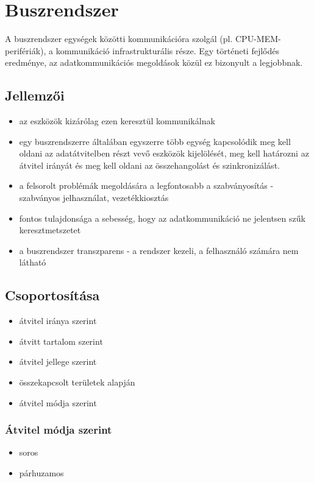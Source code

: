 
\chapter{Buszrendszer}

A buszrendszer egységek közötti kommunikációra szolgál (pl. CPU-MEM-perifériák), a kommunikáció infrastrukturális része.
Egy történeti fejlődés eredménye, az adatkommunikációs megoldások közül ez bizonyult a legjobbnak.

\section{Jellemzői}
\begin{itemize}
    \item az eszközök kizárólag ezen keresztül kommunikálnak
    \item egy buszrendszerre általában egyszerre több egység kapcsolódik \textrightarrow meg kell oldani az adatátvitelben részt vevő eszközök kijelölését, meg kell határozni az átvitel irányát és meg kell oldani az összehangolást és szinkronizálást.
    \item a felsorolt problémák megoldására a legfontosabb a szabványosítás - szabványos jelhasználat, vezetékkiosztás
    \item fontos tulajdonsága a sebesség, hogy az adatkommunikáció ne jelentsen szűk keresztmetszetet
    \item a buszrendszer transzparens - a rendszer kezeli, a felhasználó számára nem látható
\end{itemize}

\section{Csoportosítása}
\begin{itemize}
    \item átvitel iránya szerint
    \item átvitt tartalom szerint
    \item átvitel jellege szerint
    \item összekapcsolt területek alapján
    \item átvitel módja szerint
\end{itemize}

\subsection{Átvitel módja szerint}
\begin{itemize}
    \item soros
    \item párhuzamos
\end{itemize}


